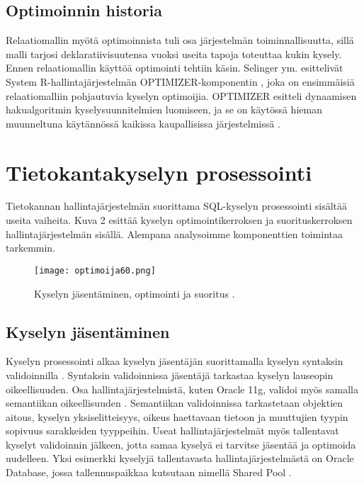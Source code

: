 \documentclass[finnish]{tktltiki2}
\theoremstyle{definition}
\theoremstyle{remark}
\begin{document}
\subsection{Optimoinnin historia}
Relaatiomallin myötä optimoinnista tuli osa järjestelmän toiminnallisuutta, sillä malli tarjosi deklaratiivisuutensa vuoksi useita tapoja toteuttaa kukin kysely. Ennen relaatiomallin käyttöä optimointi tehtiin käsin.
Selinger ym. esittelivät System R-hallintajärjestelmän OPTIMIZER-komponentin \cite{selinger1979access}, joka on ensimmäisiä relaatiomalliin pohjautuvia kyselyn optimoijia. OPTIMIZER esitteli dynaamisen hakualgoritmin kyselysuunnitelmien luomiseen, ja se on käytössä hieman muunneltuna käytännössä kaikissa kaupallisissa järjestelmissä \cite{ioannidis1996query}. 



\section{Tietokantakyselyn prosessointi}
Tietokannan hallintajärjestelmän suorittama SQL-kyselyn prosessointi sisältää useita vaiheita. Kuva 2 esittää kyselyn optimointikerroksen ja suorituskerroksen hallintajärjestelmän sisällä. Alempana analysoimme komponenttien toimintaa tarkemmin.

\begin{figure}[!h]
  \centering
    \texttt{[image: optimoija60.png]}
  \caption{Kyselyn jäsentäminen, optimointi ja suoritus \cite{ramakrishnan2003database}.}
\end{figure}

\subsection{Kyselyn jäsentäminen}
Kyselyn prosessointi alkaa kyselyn jäsentäjän suorittamalla kyselyn syntaksin validoinnilla \cite{selinger1979access}. Syntaksin validoinnissa jäsentäjä tarkastaa kyselyn lauseopin oikeellisuuden. Osa hallintajärjestelmistä, kuten Oracle 11g, validoi myös samalla semantiikan oikeellisuuden \cite{oracle2009doc}. 
Semantiikan validoinnissa tarkastetaan objektien aitous, kyselyn yksiselitteisyys, oikeus haettavaan tietoon ja muuttujien tyypin sopivuus sarakkeiden tyyppeihin. Useat hallintajärjestelmät myös
tallentavat kyselyt validoinnin jälkeen, jotta samaa kyselyä ei tarvitse jäsentää ja optimoida uudelleen. Yksi esimerkki kyselyjä tallentavasta hallintajärjestelmästä on Oracle Database, jossa tallennuspaikkaa kutsutaan nimellä Shared Pool \cite{oracle2005doc}. 
\end{document}
